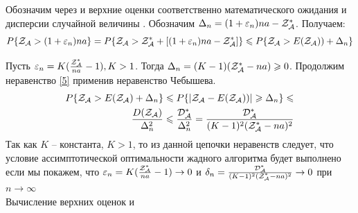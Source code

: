 \documentclass[a4paper, 14pt]{extarticle}
\numberwithin{equation}{section}
\begin{document}
Обозначим через \topboundE{} и \topboundD{} верхние оценки соответственно математического ожидания \randomvalueE{} и дисперсии \randomvalueD{} случайной величины \randomvalue{} . Обозначим $\Delta_n=(1+\varepsilon_n)na-\text{$\mathcal{Z^*_{A}}$}$. Получаем:
\begin{equation}\label{5}
P\{\text{$\mathcal{Z_{A}}$} > (1+\varepsilon_n)na\} = 
P\{\text{$\mathcal{Z_{A}}$} > \text{$\mathcal{Z^*_{A}}$}+[(1+\varepsilon_n)na-\text{$\mathcal{Z^*_{A}}$}]\} \leqslant
P\{\text{$\mathcal{Z_{A}}$} > \text{$E(\text{$\mathcal{Z_{A}}$})$})+ \Delta_n\}
\end{equation}

Пусть $\varepsilon_n = K(\frac{\text{$\mathcal{Z^*_{A}}$}}{na}-1), K>1$.
Тогда $ \Delta_n = (K-1)(\text{$\mathcal{Z^*_{A}}$}-na) \geqslant 0$.
Продолжим неравенство \eqref{5} применив неравенство Чебышева.
\begin{equation}\label{6}
\begin{aligned}
P\{\text{$\mathcal{Z_{A}}$}> E(\text{$\mathcal{Z_{A}}$})+ \Delta_n\} \leqslant 
P\{|\text{$\mathcal{Z_{A}}$}- \text{$E(\text{$\mathcal{Z_{A}}$})$})| \geqslant \Delta_n\} \leqslant \\
\frac{\text{$D(\text{$\mathcal{Z_{A}}$})$}}{\Delta^2_n} \leqslant
\frac{\text{$\mathcal{D^*_{A}}$}}{\Delta^2_n} = 
\frac{\text{$\mathcal{D^*_{A}}$}}{(K-1)^2(\text{$\mathcal{Z^*_{A}}$}-na)^2}
\end{aligned}
\end{equation}
Так как $K$ -- константа, $K>1$, то из данной цепочки неравенств следует, что условие ассимптотической оптимальности жадного алгоритма будет выполнено если мы покажем, что
$ \varepsilon_n=K(\frac{\text{$\mathcal{Z^*_{A}}$}}{na}-1) \rightarrow 0$ и 
$ \delta_n = \frac{\text{$\mathcal{D^*_{A}}$}}{(K-1)^2(\text{$\mathcal{Z^*_{A}}$}-na)^2} \rightarrow 0$ при $ n \rightarrow \infty$\\

Вычисление верхних оценок \topboundE{} и \topboundD{}\\

\newcommand{\chanceLklesserX}{$\Phi_k(x)$}
\newcommand{\randomNormalValueE}{$l_k$}
\end{document}
